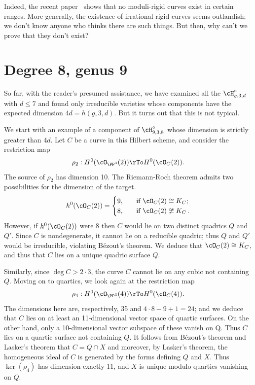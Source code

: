 Indeed, the recent paper~\cite{MR3980289} shows that no moduli-rigid curves
exist in certain ranges. More generally,  the existence of irrational rigid curves seems outlandish; we don't know anyone who thinks there are such things. But then, why can't we prove that they don't exist?



\section{Degree 8, genus 9}\label{degree 8 section}

So far, with the reader's presumed assistance, we have examined all the $\cH^\circ_{g,3,d}$ with $d\leq 7$
and found only irreducible varieties whose components have the expected dimension $4d = h(g,3,d)$. But it turns out that
this is not typical.

We start with an example of a component of $\cH^\circ_{9,3,8}$ whose dimension is strictly greater than $4d$.  Let $C$ be  a curve in this Hilbert scheme, and consider the restriction map
$$
\rho_2 : H^0(\cO_{\PP^3}(2)) \rTo H^0(\cO_C(2)).
$$
The source of $\rho_2$ has dimension 10. The Riemann-Roch theorem admits two possibilities for the dimension
of the target.
\begin{align*}
h^0(\cO_C(2)) =
\begin{cases}
9, \quad &\text{if } \cO_C(2) \cong K_C; \\
8,  \quad &\text{if } \cO_C(2) \not\cong K_C\,.
\end{cases}
\end{align*}
However, if $h^0(\cO_C(2))$ were 8 then $C$ would  lie on two distinct quadrics $Q$ and $Q'$. Since $C$ is nondegenerate, it cannot lie on a reducible quadric; thus $Q$ and $Q'$ would  be irreducible,  violating B\'ezout's theorem. We deduce that $\cO_C(2) \cong K_C$, and thus that $C$ lies on a unique quadric surface $Q$.

Similarly, since $\deg C > 2\cdot 3$, the curve $C$ cannot lie on any cubic not containing $Q$. Moving on to quartics, we look again at the restriction map
$$
\rho_4 : H^0(\cO_{\PP^3}(4)) \rTo H^0(\cO_C(4)).
$$
The dimensions here are, respectively, 35 and $4\cdot 8 - 9 + 1 = 24$; and we deduce that $C$ lies on at least an 11-dimensional vector space of quartic surfaces. On the other hand, only a 10-dimensional vector subspace of these vanish on Q. Thus $C$ lies on a quartic surface not containing $Q$. It follows from B\'ezout's theorem and 
Lasker's theorem that  $C = Q \cap X$
and moreover, by Lasker's theorem, the homogeneous ideal of $C$ is generated by the forms defining $Q$ and $X$. Thus $\ker(\rho_4)$ has dimension exactly 11, and  $X$ is unique modulo quartics vanishing on $Q$.


